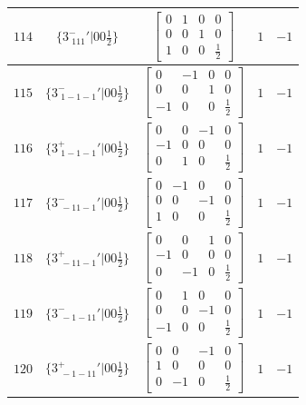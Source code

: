 \documentclass[fleqn,8pt]{jsarticle}
\begin{document}
\begin{longtable}{ccccc}
$ 114 $ & $ \{3^{-}_{\,\,111}{}'|0 0 \frac{1}{2}\} $ & $ \begin{bmatrix} 0 & 1 & 0 & 0 \\ 0 & 0 & 1 & 0 \\ 1 & 0 & 0 & \frac{1}{2} \end{bmatrix} $ & $ 1 $ & $ -1 $ \\ \hline
$ 115 $ & $ \{3^{-}_{\,\,1-1-1}{}'|0 0 \frac{1}{2}\} $ & $ \begin{bmatrix} 0 & -1 & 0 & 0 \\ 0 & 0 & 1 & 0 \\ -1 & 0 & 0 & \frac{1}{2} \end{bmatrix} $ & $ 1 $ & $ -1 $ \\ \hline
$ 116 $ & $ \{3^{+}_{\,\,1-1-1}{}'|0 0 \frac{1}{2}\} $ & $ \begin{bmatrix} 0 & 0 & -1 & 0 \\ -1 & 0 & 0 & 0 \\ 0 & 1 & 0 & \frac{1}{2} \end{bmatrix} $ & $ 1 $ & $ -1 $ \\ \hline
$ 117 $ & $ \{3^{-}_{\,\,-11-1}{}'|0 0 \frac{1}{2}\} $ & $ \begin{bmatrix} 0 & -1 & 0 & 0 \\ 0 & 0 & -1 & 0 \\ 1 & 0 & 0 & \frac{1}{2} \end{bmatrix} $ & $ 1 $ & $ -1 $ \\ \hline
$ 118 $ & $ \{3^{+}_{\,\,-11-1}{}'|0 0 \frac{1}{2}\} $ & $ \begin{bmatrix} 0 & 0 & 1 & 0 \\ -1 & 0 & 0 & 0 \\ 0 & -1 & 0 & \frac{1}{2} \end{bmatrix} $ & $ 1 $ & $ -1 $ \\ \hline
$ 119 $ & $ \{3^{-}_{\,\,-1-11}{}'|0 0 \frac{1}{2}\} $ & $ \begin{bmatrix} 0 & 1 & 0 & 0 \\ 0 & 0 & -1 & 0 \\ -1 & 0 & 0 & \frac{1}{2} \end{bmatrix} $ & $ 1 $ & $ -1 $ \\ \hline
$ 120 $ & $ \{3^{+}_{\,\,-1-11}{}'|0 0 \frac{1}{2}\} $ & $ \begin{bmatrix} 0 & 0 & -1 & 0 \\ 1 & 0 & 0 & 0 \\ 0 & -1 & 0 & \frac{1}{2} \end{bmatrix} $ & $ 1 $ & $ -1 $ \\ \hline

\end{longtable}
\end{document}
